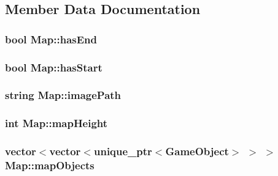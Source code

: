 \subsection{Member Data Documentation}
\hypertarget{class_map_acffbd1a9311b093f875753b802e966af}{
\subsubsection[{has\+End}]{\setlength{\rightskip}{0pt plus 5cm}bool Map\+::has\+End\hspace{0.3cm}{\ttfamily [private]}}}\label{class_map_acffbd1a9311b093f875753b802e966af}
\hypertarget{class_map_ab796b34a605f32873f72c9c348f38da0}{
\subsubsection[{has\+Start}]{\setlength{\rightskip}{0pt plus 5cm}bool Map\+::has\+Start\hspace{0.3cm}{\ttfamily [private]}}}\label{class_map_ab796b34a605f32873f72c9c348f38da0}
\hypertarget{class_map_a87051704cf631b77d7a230361942081b}{
\subsubsection[{image\+Path}]{\setlength{\rightskip}{0pt plus 5cm}string Map\+::image\+Path\hspace{0.3cm}{\ttfamily [private]}}}\label{class_map_a87051704cf631b77d7a230361942081b}
\hypertarget{class_map_a4674385319ae4f0c6672f4fe69f97b5c}{
\subsubsection[{map\+Height}]{\setlength{\rightskip}{0pt plus 5cm}int Map\+::map\+Height\hspace{0.3cm}{\ttfamily [private]}}}\label{class_map_a4674385319ae4f0c6672f4fe69f97b5c}
\hypertarget{class_map_ac2295b10052b4e68dcbdb8c37d6535b8}{
\subsubsection[{map\+Objects}]{\setlength{\rightskip}{0pt plus 5cm}vector$<$vector$<$unique\+\_\+ptr$<${\bf Game\+Object}$>$ $>$ $>$ Map\+::map\+Objects\hspace{0.3cm}{\ttfamily [private]}}}\label{class_map_ac2295b10052b4e68dcbdb8c37d6535b8}
